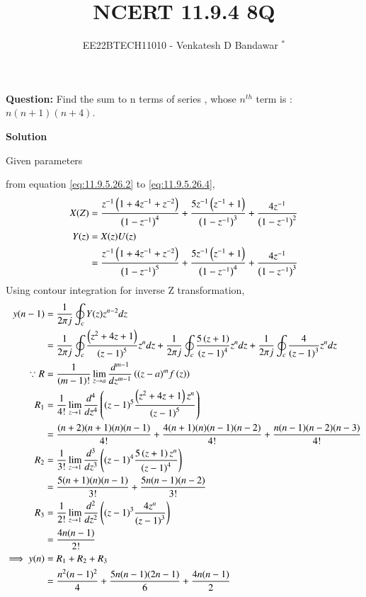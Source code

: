 \documentclass[journal,12pt,onecolumn]{IEEEtran}
\theoremstyle{remark}
\begin{document}

\vspace{3cm}

\title{NCERT 11.9.4 8Q}
\author{EE22BTECH11010 - Venkatesh D Bandawar $^{*}$%
}
\maketitle
\bigskip

\renewcommand{\thefigure}{\theenumi}
\renewcommand{\thetable}{\theenumi}

\textbf{Question:} Find the sum to n terms of series , whose $n^{th}$ term is : $n(n+1)(n+4)$.

\textbf{Solution}
\begin{table}[!h] 
\centering

\caption{Given parameters}
\label{given parameters list}
\end{table}

from equation \eqref{eq:11.9.5.26.2} to \eqref{eq:11.9.5.26.4},\\
    \begin{align}
        X(Z) &= \frac{z^{-1}\left(1+4z^{-1}+z^{-2}\right)}{\left(1-z^{-1}\right)^4} + \frac{5z^{-1}\left(z^{-1}+1\right)}{\left(1-z^{-1}\right)^3} + \frac{4z^{-1}}{\left(1-z^{-1}\right)^2} \\
        Y(z) &= X(z)U(z)\\
        &= \frac{z^{-1}\left(1+4z^{-1}+z^{-2}\right)}{\left(1-z^{-1}\right)^5} + \frac{5z^{-1}\left(z^{-1}+1\right)}{\left(1-z^{-1}\right)^4} + \frac{4z^{-1}}{\left(1-z^{-1}\right)^3} 
    \end{align}
Using contour integration for inverse Z transformation,
    \begin{align}
        y(n-1) &= \frac{1}{2\pi j}\oint_c Y(z) z^{n-2} dz \\
        &= \frac{1}{2\pi j}\oint_c \frac{\left(z^2+4z+1\right)}{\left(z-1\right)^5} z^{n} dz  + \frac{1}{2\pi j}\oint_c \frac{5\left(z+1\right)}{\left(z-1\right)^4} z^{n} dz  + \frac{1}{2\pi j}\oint_c \frac{4}{\left(z-1\right)^3} z^{n} dz \\
        \because R&=\frac{1}{\left(m-1\right)!}\lim\limits_{z\to a}\frac{d^{m-1}}{dz^{m-1}}\left({(z-a)}^{m}f\left(z\right)\right)\\
        R_1 &=\frac{1}{4!}\lim\limits_{z\to 1}\frac{d^4}{dz^4}\left((z-1)^5 \frac{\left(z^2+4z+1\right)z^n}{\left(z-1\right)^5}\right)\\
        &= \frac{(n+2)(n+1)(n)(n-1)}{4!} + \frac{4(n+1)(n)(n-1)(n-2)}{4!} + \frac{n(n-1)(n-2)(n-3)}{4!}\\
        R_2 &=\frac{1}{3!}\lim\limits_{z\to 1}\frac{d^3}{dz^3} \left((z-1)^4 \frac{5\left(z+1\right)z^n}{\left(z-1\right)^4}\right)\\
        &= \frac{5(n+1)(n)(n-1)}{3!} + \frac{5n(n-1)(n-2)}{3!}\\
        R_3 &=\frac{1}{2!}\lim\limits_{z\to 1}\frac{d^2}{dz^2} \left((z-1)^3 \frac{4z^n}{\left(z-1\right)^3}\right)\\
        &= \frac{4n(n-1)}{2!}\\
        \implies y(n) &= R_1 + R_2 + R_3 \\
        &= \frac{n^2(n-1)^2}{4} + \frac{5n(n-1)(2n-1)}{6} + \frac{4n(n-1)}{2}
    \end{align}
\end{document}
